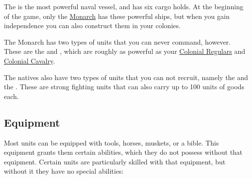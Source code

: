 \documentclass[12pt]{article}
\begin{document}
The  is the most powerful naval vessel, and has six
cargo holds. At the beginning of the game, only the
\hyperlink{Monarch}{Monarch} has these powerful ships, but when you gain
independence you can also construct them in your colonies.

The Monarch has two types of units that you can never command,
however. These are the  and , which are roughly as powerful as your \hyperlink{Colonial
Regular}{Colonial Regulars} and \hyperlink{Colonial Cavalry}{Colonial
Cavalry}.

The natives also have two types of units that you can not recruit,
namely the  and the . These are
strong fighting units that can also carry up to 100 units of goods
each.


\hypertarget{Equipment}{\subsection{Equipment}}

Most units can be equipped with tools, horses, muskets, or a
bible. This equipment grants them certain abilities, which they do not
possess without that equipment. Certain units are particularly skilled
with that equipment, but without it they have no special abilities:
\end{document}
